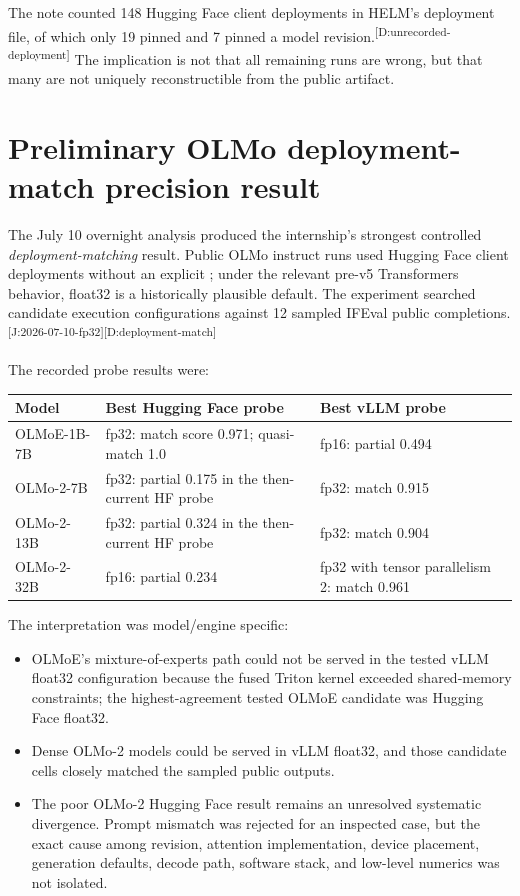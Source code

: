 \documentclass[11pt,oneside]{report}
\newcommand{\code}[1]{\texttt{\detokenize{#1}}}
\newcommand{\evmark}[1]{\allowbreak\textsuperscript{\scriptsize\textnormal{[#1]}}}
\newcommand{\docref}[1]{\evmark{D:#1}}
\newcommand{\journalref}[1]{\evmark{J:#1}}
\begin{document}
The note counted 148 Hugging Face client deployments in HELM's deployment file, of which only 19 pinned \code{torch_dtype} and 7 pinned a model revision.\docref{unrecorded-deployment} The implication is not that all remaining runs are wrong, but that many are not uniquely reconstructible from the public artifact.

\section{Preliminary OLMo deployment-match precision result}

The July 10 overnight analysis produced the internship's strongest controlled \emph{deployment-matching} result. Public OLMo instruct runs used Hugging Face client deployments without an explicit \code{torch_dtype}; under the relevant pre-v5 Transformers behavior, float32 is a historically plausible default. The experiment searched candidate execution configurations against 12 sampled IFEval public completions.\journalref{2026-07-10-fp32}\docref{deployment-match}

The recorded probe results were:

\begin{longtable}{@{}P{0.28\textwidth}P{0.30\textwidth}P{0.30\textwidth}@{}}
\toprule
Model & Best Hugging Face probe & Best vLLM probe \\
\midrule
OLMoE-1B-7B & fp32: match score 0.971; quasi-match 1.0 & fp16: partial 0.494 \\
OLMo-2-7B & fp32: partial 0.175 in the then-current HF probe & fp32: match 0.915 \\
OLMo-2-13B & fp32: partial 0.324 in the then-current HF probe & fp32: match 0.904 \\
OLMo-2-32B & fp16: partial 0.234 & fp32 with tensor parallelism 2: match 0.961 \\
\bottomrule
\end{longtable}

The interpretation was model/engine specific:

\begin{itemize}
  \item OLMoE's mixture-of-experts path could not be served in the tested vLLM float32 configuration because the fused Triton kernel exceeded shared-memory constraints; the highest-agreement tested OLMoE candidate was Hugging Face float32.
  \item Dense OLMo-2 models could be served in vLLM float32, and those candidate cells closely matched the sampled public outputs.
  \item The poor OLMo-2 Hugging Face result remains an unresolved systematic divergence. Prompt mismatch was rejected for an inspected case, but the exact cause among revision, attention implementation, device placement, generation defaults, decode path, software stack, and low-level numerics was not isolated.
\end{itemize}
\end{document}
